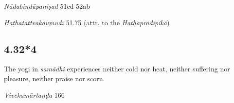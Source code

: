 \begin{ekdosis}

\begin{testimonia}[hp04_032_3]
\emph{Nādabindūpaniṣad} 51cd-52ab
\begin{versinnote}
\end{versinnote}

\emph{Haṭhatattvakaumudī} 51.75 (attr. to the \emph{Haṭhapradīpikā})
\begin{versinnote}
\end{versinnote}
\end{testimonia}


\subsection*{4.32*4}
\begin{translation}[hp04_032_4]
The yogi in \textit{samādhi} experiences neither cold nor heat, neither suffering nor pleasure, neither praise nor scorn.
\end{translation}

\begin{sources}[hp04_032_4]
\emph{Vivekamārtaṇḍa} 166
\begin{versinnote}
\end{versinnote}
\end{sources}




\end{ekdosis}
